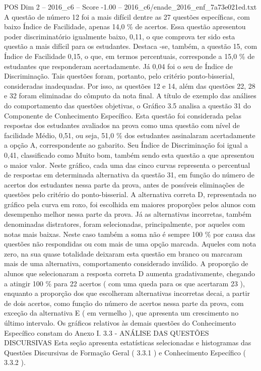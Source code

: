 \begin{textsample}{POS Dim 2 – 2016\_c6 – Score -1.00 – 2016\_c6/enade\_2016\_enf\_7a73e021ed.txt}
A questão de número 12 foi a mais difícil dentre as 27 questões específicas, com baixo Índice de Facilidade, apenas 14,0 \% de acertos.
Essa questão apresentou poder discriminatório igualmente baixo, 0,11, o que comprova ter sido esta questão a mais difícil para os estudantes.
Destaca -se, também, a questão 15, com Índice de Facilidade 0,15, o que, em termos percentuais, corresponde a 15,0 \% de estudantes que responderam acertadamente.
Já 0,04 foi o seu de Índice de Discriminação.
Tais questões foram, portanto, pelo critério ponto-bisserial, consideradas inadequadas.
Por isso, as questões 12 e 14, além das questões 22, 28 e 32 foram eliminadas do cômputo da nota final.
A título de exemplo das análises do comportamento das questões objetivas, o Gráfico 3.5 analisa a questão 31 do Componente de Conhecimento Específico.
Esta questão foi considerada pelas respostas dos estudantes avaliados na prova como uma questão com nível de facilidade Médio, 0,51, ou seja, 51,0 \% dos estudantes assinalaram acertadamente a opção A, correspondente ao gabarito.
Seu Índice de Discriminação foi igual a 0,41, classificado como Muito bom, também sendo esta questão a que apresentou o maior valor.
Neste gráfico, cada uma das cinco curvas representa o percentual de respostas em determinada alternativa da questão 31, em função do número de acertos dos estudantes nessa parte da prova, antes de possíveis eliminações de questões pelo critério do ponto-bisserial.
A alternativa correta D, representada no gráfico pela curva em roxo, foi escolhida em maiores proporções pelos alunos com desempenho melhor nessa parte da prova.
Já as alternativas incorretas, também denominadas distratores, foram selecionadas, principalmente, por aqueles com notas mais baixas.
Neste caso também a soma não é sempre 100 \% por causa das questões não respondidas ou com mais de uma opção marcada.
Aqueles com nota zero, na sua quase totalidade deixaram esta questão em branco ou marcaram mais de uma alternativa, comportamento considerado inválido.
A proporção de alunos que selecionaram a resposta correta D aumenta gradativamente, chegando a atingir 100 \% para 22 acertos ( com uma queda para os que acertaram 23 ), enquanto a proporção dos que escolheram alternativas incorretas decai, a partir de dois acertos, como função do número de acertos nessa parte da prova, com exceção da alternativa E ( em vermelho ), que apresenta um crescimento no último intervalo.
Os gráficos relativos às demais questões do Conhecimento Específico constam do Anexo I. 3.3 - ANÁLISE DAS QUESTÕES DISCURSIVAS Esta seção apresenta estatísticas selecionadas e histogramas das Questões Discursivas de Formação Geral ( 3.3.1 ) e Conhecimento Específico ( 3.3.2 ).

\end{textsample}
